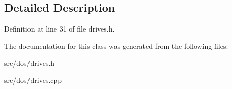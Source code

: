 \subsection{Detailed Description}


Definition at line 31 of file drives.\-h.



The documentation for this class was generated from the following files\-:\begin{DoxyCompactItemize}
\item 
src/dos/drives.\-h\item 
src/dos/drives.\-cpp\end{DoxyCompactItemize}
